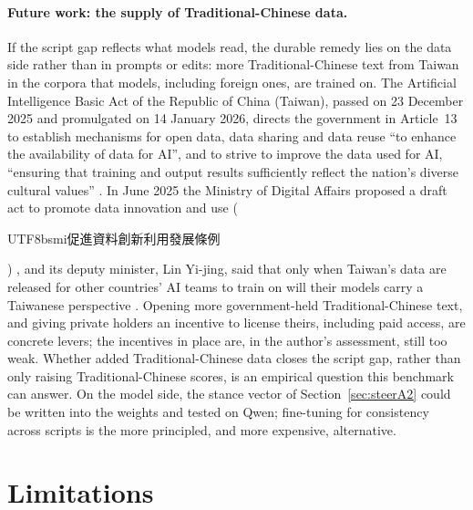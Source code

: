 \documentclass[11pt,a4paper]{article}
\newcommand{\zht}[1]{\begin{CJK}{UTF8}{bsmi}#1\end{CJK}}
\begin{document}
\paragraph{Future work: the supply of Traditional-Chinese data.}
If the script gap reflects what models read, the durable remedy lies on the data side rather than in prompts or edits:
more Traditional-Chinese text from Taiwan in the corpora that models, including foreign ones, are trained on. The
Artificial Intelligence Basic Act of the Republic of China (Taiwan), passed on 23 December 2025
\citep{technews2025aibasic} and promulgated on 14 January 2026, directs the government in Article~13 to establish
mechanisms for open data, data sharing and data reuse ``to enhance the availability of data for AI'', and to strive
to improve the data used for AI, ``ensuring that training and output results sufficiently reflect the nation's
diverse cultural values'' \citep{roc2026aibasic}. In June 2025 the Ministry of Digital Affairs proposed a draft act to promote data innovation
and use (\zht{促進資料創新利用發展條例}) \citep{ltn2025modadraft}, and its deputy minister, Lin Yi-jing, said that
only when Taiwan's data are released for other countries' AI teams to train on will their models carry a Taiwanese
perspective \citep{pts2025moda}. Opening more government-held Traditional-Chinese
text, and giving private holders an incentive to license theirs, including paid access, are concrete levers; the
incentives in place are, in the author's assessment, still too weak. Whether added Traditional-Chinese data closes the
script gap, rather than only raising Traditional-Chinese scores, is an empirical question this benchmark can answer. On
the model side, the stance vector of Section~\ref{sec:steerA2} could be written into the weights and tested on Qwen;
fine-tuning for consistency across scripts is the more principled, and more expensive, alternative.

\section{Limitations}\label{sec:limits}
\end{document}
